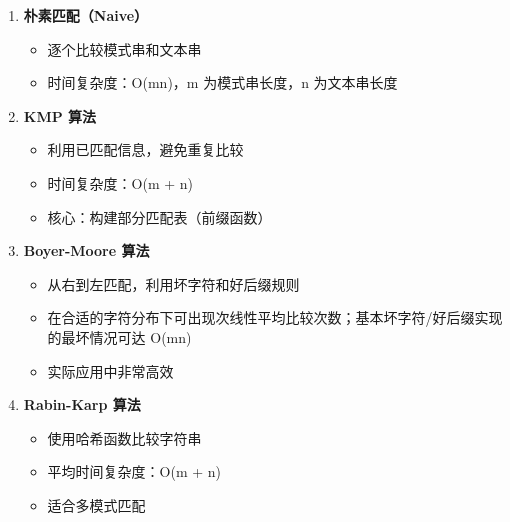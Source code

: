 \begin{enumerate}
  \item \textbf{朴素匹配（Naive）}
    \begin{itemize}
      \item 逐个比较模式串和文本串
      \item 时间复杂度：O(mn)，m 为模式串长度，n 为文本串长度
    \end{itemize}

  \item \textbf{KMP 算法}
    \begin{itemize}
      \item 利用已匹配信息，避免重复比较
      \item 时间复杂度：O(m + n)
      \item 核心：构建部分匹配表（前缀函数）
    \end{itemize}

  \item \textbf{Boyer-Moore 算法}
    \begin{itemize}
      \item 从右到左匹配，利用坏字符和好后缀规则
      \item 在合适的字符分布下可出现次线性平均比较次数；基本坏字符/好后缀实现的最坏情况可达 O(mn)
      \item 实际应用中非常高效
    \end{itemize}

  \item \textbf{Rabin-Karp 算法}
    \begin{itemize}
      \item 使用哈希函数比较字符串
      \item 平均时间复杂度：O(m + n)
      \item 适合多模式匹配
    \end{itemize}
\end{enumerate}

